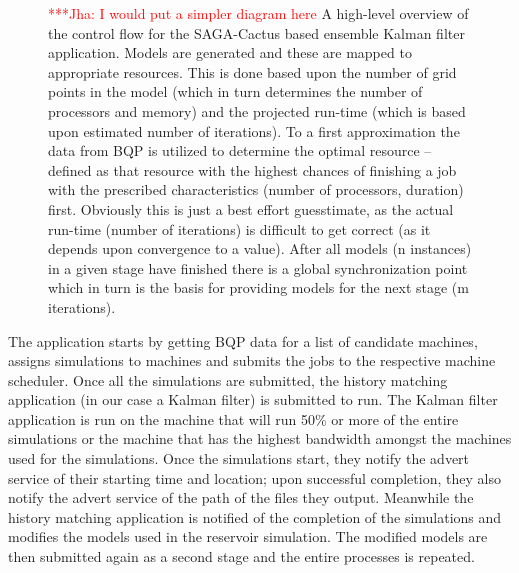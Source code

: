 \documentclass[conference,final]{IEEEtran}
\newcommand{\jhanote}[1]{ {\textcolor{red} { ***Jha: #1 }}}
\begin{document}
\begin{figure}
\begin{center}
\end{center}
\caption{\jhanote{I would put a simpler diagram here} A high-level
  overview of the control flow for the SAGA-Cactus based ensemble
  Kalman filter application. Models are generated and these are mapped
  to appropriate resources. This is done based upon the number of grid
  points in the model (which in turn determines the number of
  processors and memory) and the projected run-time (which is based
  upon estimated number of iterations). To a first approximation the
  data from BQP is utilized to determine the optimal resource --
  defined as that resource with the highest chances of finishing a job
  with the prescribed characteristics (number of processors, duration)
  first. Obviously this is just a best effort guesstimate, as the
  actual run-time (number of iterations) is difficult to get correct
  (as it depends upon convergence to a value). After all models (n
  instances) in a given stage have finished there is a global
  synchronization point which in turn is the basis for providing
  models for the next stage (m iterations).}
\label{fig:controlflow}
\end{figure}

The application starts by getting BQP data for a list of candidate
machines, assigns simulations to machines and submits the jobs to the
respective machine scheduler. Once all the simulations are submitted,
the history matching application (in our case a Kalman filter) is
submitted to run. The Kalman filter application is run on the
machine that will run 50\% or more of the entire simulations or the
machine that has the highest bandwidth amongst the machines used for
the simulations.  Once the simulations start, they notify the advert
service of their starting time and location; upon successful
completion, they also notify the advert service of the path of the
files they output.  Meanwhile the history matching application is
notified of the completion of the simulations and modifies the models
used in the reservoir simulation. The modified models are then
submitted again as a second stage and the entire processes is
repeated.

\end{document}
